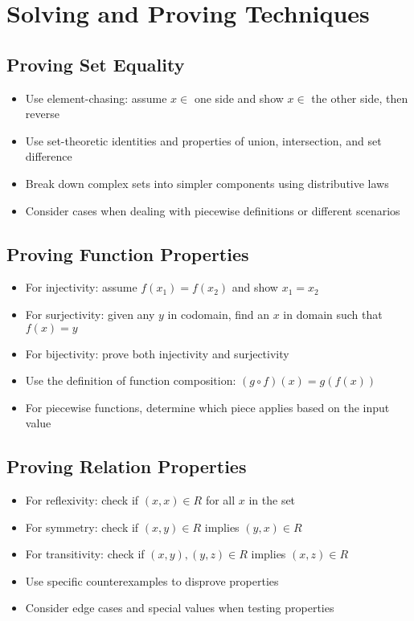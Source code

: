 \section{Solving and Proving Techniques}

\subsection*{Proving Set Equality}
\begin{itemize}
\item Use element-chasing: assume $x \in$ one side and show $x \in$ the other side, then reverse
\item Use set-theoretic identities and properties of union, intersection, and set difference
\item Break down complex sets into simpler components using distributive laws
\item Consider cases when dealing with piecewise definitions or different scenarios
\end{itemize}

\subsection*{Proving Function Properties}
\begin{itemize}
\item For injectivity: assume $f(x_1) = f(x_2)$ and show $x_1 = x_2$
\item For surjectivity: given any $y$ in codomain, find an $x$ in domain such that $f(x) = y$
\item For bijectivity: prove both injectivity and surjectivity
\item Use the definition of function composition: $(g \circ f)(x) = g(f(x))$
\item For piecewise functions, determine which piece applies based on the input value
\end{itemize}

\subsection*{Proving Relation Properties}
\begin{itemize}
\item For reflexivity: check if $(x,x) \in R$ for all $x$ in the set
\item For symmetry: check if $(x,y) \in R$ implies $(y,x) \in R$
\item For transitivity: check if $(x,y), (y,z) \in R$ implies $(x,z) \in R$
\item Use specific counterexamples to disprove properties
\item Consider edge cases and special values when testing properties
\end{itemize}

